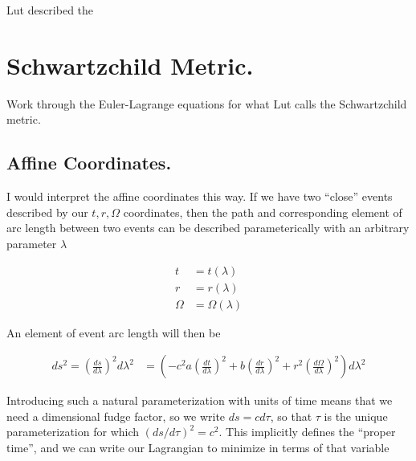 \documentclass{article}      %
\newcommand{\PD}[2]{\frac{\partial {#2}}{\partial {#1}}}
\newcommand{\CC}[0]{c^2}
\newcommand{\adot}[0]{\dot{a}}
\newcommand{\rdot}[0]{\dot{r}}
\begin{document}
Lut described the 

\section{ Schwartzchild Metric. } 

Work through the Euler-Lagrange equations for what Lut calls the 
Schwartzchild metric.

\subsection{ Affine Coordinates. }


I would interpret the affine coordinates this way.  If we have two ``close'' events described by our $t,r,\Omega$ coordinates, then the path and corresponding
element of arc length between two events can be described parameterically
with an arbitrary parameter $\lambda$

\begin{align*}
t &= t(\lambda) \\
r &= r(\lambda) \\
\Omega &= \Omega(\lambda)
\end{align*}

An element of event arc length will then be

\begin{align*}
ds^2 = \left(\frac{ds}{d\lambda}\right)^2 {d\lambda}^2
&=
\left( -\CC a \left(\frac{dt}{d\lambda}\right)^2 + {b} \left(\frac{dr}{d\lambda}\right)^2 + r^2\left(\frac{d\Omega}{d\lambda}\right)^2 \right) {d\lambda}^2
\end{align*}


Introducing such a natural parameterization with units of time means that we need a dimensional fudge factor, so we write $ds = c d\tau$, so that $\tau$ is the unique parameterization for which $(ds/d\tau)^2 = c^2$.
This implicitly defines the ``proper time'', and we can write our Lagrangian to minimize in terms of that variable
\end{document}
